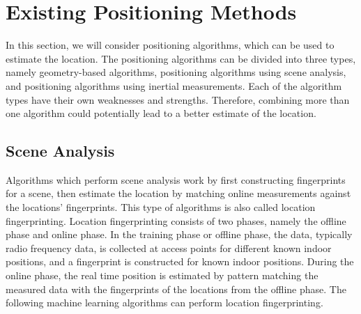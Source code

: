 \section{Existing Positioning Methods} \label{sec:existingpositioningmethods}
In this section, we will consider positioning algorithms, which can be used to estimate the location. The positioning algorithms can be divided into three types, namely geometry-based algorithms, positioning algorithms using scene analysis, and positioning algorithms using inertial measurements. Each of the algorithm types have their own weaknesses and strengths. Therefore, combining more than one algorithm could potentially lead to a better estimate of the location. 

\subsection{Scene Analysis}
\label{sec:scene_analysis}
Algorithms which perform scene analysis work by first constructing fingerprints for a scene, then estimate the location by matching online measurements against the locations' fingerprints. This type of algorithms is also called location fingerprinting. Location fingerprinting consists of two phases, namely the offline phase and online phase. In the training phase or offline phase, the data, typically radio frequency data, is collected at access points for different known indoor positions, and a fingerprint is constructed for known indoor positions. During the online phase, the real time position is estimated by pattern matching the measured data with the fingerprints of the locations from the offline phase.\cite{IPS01} The following machine learning algorithms can perform location fingerprinting.

